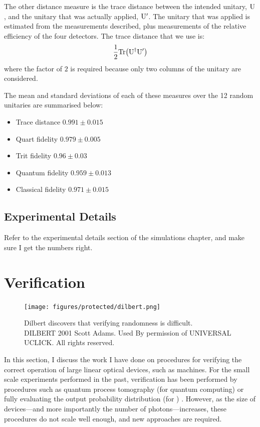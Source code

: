 The other distance measure is the trace distance between the intended unitary,
\(\mathrm{U}\), and the unitary that was actually applied, \(\mathrm{U}^{\prime}\).
The unitary that was applied is estimated from the measurements described, plus
measurements of the relative efficiency of the four detectors. The trace
distance that we use is:
\begin{equation}
  \frac{1}{2} \mathrm{Tr} \!\left( \mathrm{U}^{\dagger} \mathrm{U}^{\prime} \right)
\end{equation}
where the factor of \(2\) is required because only two columns of the unitary
are considered.

The mean and standard deviations of each of these measures over the 12 random
unitaries are summarised below:
\begin{itemize}
  \item Trace distance \(0.991\pm0.015\)
  \item Quart fidelity \(0.979\pm0.005\)
  \item Trit fidelity \(0.96\pm0.03\)
  \item Quantum fidelity \(0.959\pm0.013\)
  \item Classical fidelity \(0.971\pm0.015\)
\end{itemize}

\subsection{Experimental Details}
\label{sec:BenchmarkingExperiment}
Refer to the experimental details section of the simulations chapter, and make
sure I get the numbers right.

\section{Verification}
\label{sec:Verification}
\begin{figure}[t]
  \centering
  \texttt{[image: figures/protected/dilbert.png]}
  \caption[Dilbert discovers that verifying randomness is difficult.]
  {Dilbert discovers that verifying randomness is difficult.\\DILBERT
  \textcopyright{} 2001 Scott Adams. Used By permission of UNIVERSAL UCLICK. All
  rights reserved.}
  \label{fig:dilbert}
\end{figure}
In this section, I discuss the work I have done on procedures for verifying the
correct operation of large linear optical devices, such as \bosonsampling{}
machines. For the small scale experiments performed in the past, verification
has been performed by procedures such as quantum process tomography (for
quantum computing)  or fully evaluating the output
probability distribution (for \bosonsampling{}) . However, as the size of devices---and more importantly the number
of photons---increases, these procedures do not scale well enough, and new
approaches are required.

